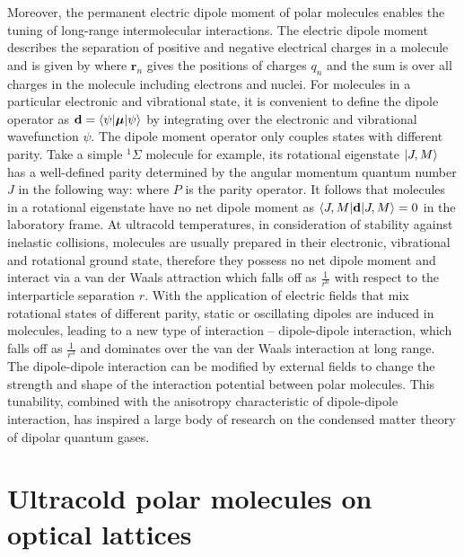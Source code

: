 Moreover, the permanent electric dipole moment of polar molecules enables the tuning of long-range intermolecular 
interactions. The electric dipole moment describes the separation of positive and negative electrical charges
in a molecule and is given by
where $\mathbf{r}_{n}$ gives the positions of charges $q_n$ and the sum is over all charges in the molecule including 
electrons and nuclei. For molecules in a particular electronic and vibrational state, it is convenient to define the
dipole operator as $\mathbf{d} = \langle \psi | \boldsymbol{\mu} | \psi \rangle$ by integrating over the electronic and
vibrational wavefunction $\psi$. The dipole moment operator only couples states with different
parity. Take a simple $^{1}\Sigma$ molecule for example,  its rotational eigenstate $| J, M \rangle$  has a well-defined parity 
determined by the angular momentum quantum number $J$ in the following way:
where $P$ is the parity operator. It follows that molecules in a rotational eigenstate have no net dipole moment as $\langle J, M | \mathbf{d} | J, M \rangle = 0$ in the laboratory frame. At ultracold temperatures, in consideration of stability against inelastic collisions, 
molecules are usually prepared in their electronic, vibrational and rotational ground state, therefore they possess no net
dipole moment and interact via a van der Waals attraction which falls off as $\frac{1 }{r^6}$ with respect to the
interparticle separation $r$. With the application of electric fields that mix rotational states of different parity, static or 
oscillating dipoles are induced in molecules, leading to a new type of interaction -- dipole-dipole interaction, which falls off
as $\frac{1}{r^3}$ and dominates over the van der Waals interaction at long range. The dipole-dipole interaction can be
modified by external fields to change the strength and shape of the interaction potential between 
polar molecules\cite{micheli2007, buchler2007a}. This tunability, combined with the anisotropy characteristic of 
dipole-dipole interaction, has inspired a large body of research on the condensed matter theory of dipolar quantum 
gases\cite{baranov2008, lahaye2009, trefzger2011, Baranov2012}. 




\section{Ultracold polar molecules on optical lattices}
\label{sec:opticalLattice}

